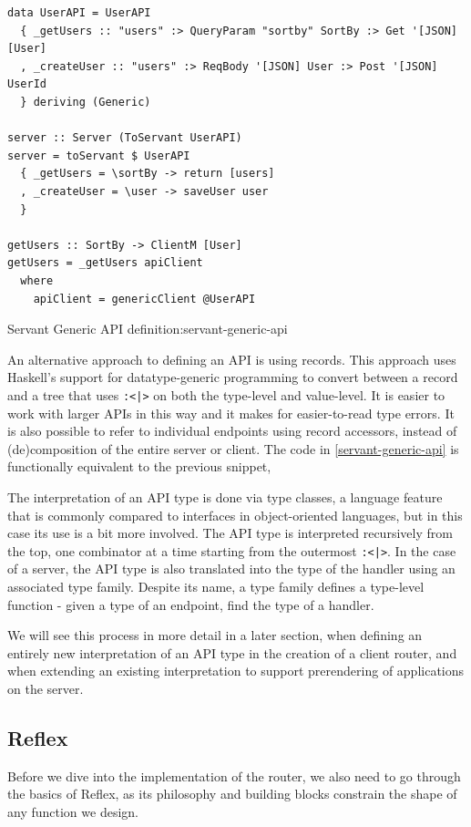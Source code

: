 \documentclass[english,odsaz]{fitthesis}
\begin{document}
\begin{listing}[htbp]
\begin{verbatim}
data UserAPI = UserAPI
  { _getUsers :: "users" :> QueryParam "sortby" SortBy :> Get '[JSON] [User]
  , _createUser :: "users" :> ReqBody '[JSON] User :> Post '[JSON] UserId
  } deriving (Generic)

server :: Server (ToServant UserAPI)
server = toServant $ UserAPI
  { _getUsers = \sortBy -> return [users]
  , _createUser = \user -> saveUser user
  }

getUsers :: SortBy -> ClientM [User]
getUsers = _getUsers apiClient
  where
    apiClient = genericClient @UserAPI
\end{verbatim}
\caption{Servant Generic API definition:servant-generic-api}
\end{listing}

An alternative approach to defining an API is using records. This approach uses
Haskell's support for datatype-generic programming to convert between a record
and a tree that uses \texttt{:<|>} on both the type-level and value-level. It is easier
to work with larger APIs in this way and it makes for easier-to-read type
errors. It is also possible to refer to individual endpoints using record
accessors, instead of (de)composition of the entire server or client. The code
in \ref{servant-generic-api} is functionally equivalent to the previous snippet,

The interpretation of an API type is done via type classes, a language feature
that is commonly compared to interfaces in object-oriented languages, but in
this case its use is a bit more involved. The API type is interpreted
recursively from the top, one combinator at a time starting from the outermost
\texttt{:<|>}. In the case of a server, the API type is also translated into the type of
the handler using an associated type family. Despite its name, a type family
defines a type-level function - given a type of an endpoint, find the type of a
handler.

We will see this process in more detail in a later section, when defining an
entirely new interpretation of an API type in the creation of a client router,
and when extending an existing interpretation to support prerendering of
applications on the server.

\subsection{Reflex}
\label{sec:orgf216372}
Before we dive into the implementation of the router, we also need to go through
the basics of Reflex, as its philosophy and building blocks constrain the
shape of any function we design.
\end{document}
